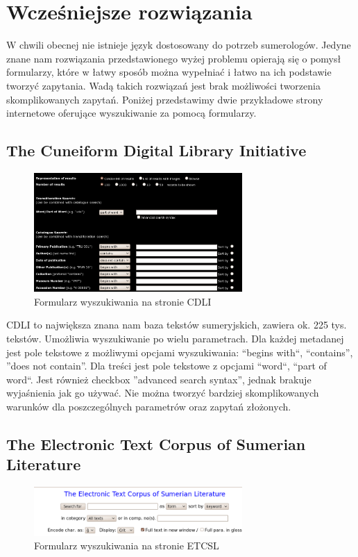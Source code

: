 \chapter{Wcześniejsze rozwiązania}\label{r:losers}


W chwili obecnej nie istnieje język dostosowany do potrzeb sumerologów. Jedyne znane nam rozwiązania przedstawionego wyżej problemu opierają się o pomysł formularzy, które w łatwy sposób można wypełniać i łatwo na ich podstawie tworzyć zapytania. Wadą takich rozwiązań jest brak możliwości tworzenia skomplikowanych zapytań.
Poniżej przedstawimy dwie przykładowe strony internetowe oferujące wyszukiwanie za pomocą formularzy.
\section{The Cuneiform Digital Library Initiative \cite{cdli}}
\begin{figure}[h]
 \centering
 \includegraphics[width=300px]{../diagramy/cdli-search.png}
 \caption{Formularz wyszukiwania na stronie CDLI}
 \label{fig:cdli-search}
\end{figure}

CDLI to największa znana nam baza tekstów sumeryjskich, zawiera ok. 225 tys. tekstów. 
Umożliwia wyszukiwanie po wielu parametrach.
Dla każdej metadanej jest pole tekstowe z możliwymi opcjami wyszukiwania: ``begins with``, ``contains'', ''does not contain''. 
Dla treści jest pole tekstowe z opcjami ``word``, ``part of word``.
Jest również checkbox ''advanced search syntax'', jednak brakuje wyjaśnienia jak go używać.
Nie można tworzyć bardziej skomplikowanych warunków dla poszczególnych parametrów oraz zapytań złożonych.

\section{The Electronic Text Corpus of Sumerian Literature \cite{etcsl}} 
\begin{figure}[h]
 \centering
 \includegraphics[width=300px]{../diagramy/etcsl-search.png}
 \caption{Formularz wyszukiwania na stronie ETCSL}
 \label{fig:etcsl-search}
\end{figure}

